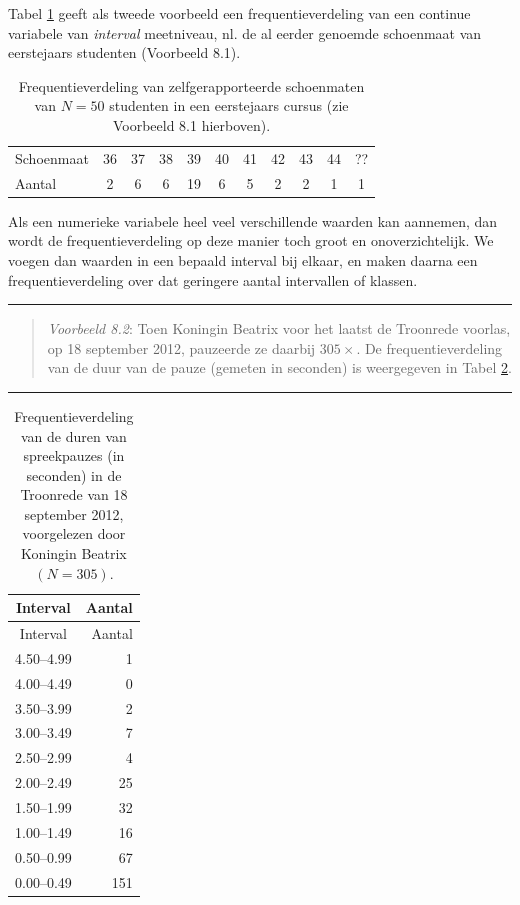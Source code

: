 \documentclass[
]{book}
\begin{document}
Tabel \ref{tab:schoenmaat} geeft als tweede voorbeeld een
frequentieverdeling van een continue variabele van \emph{interval}
meetniveau, nl. de al eerder genoemde schoenmaat van eerstejaars
studenten (Voorbeeld 8.1).

\begin{longtable}[]{@{}lcccccccccc@{}}
\caption{\label{tab:schoenmaat} Frequentieverdeling van zelfgerapporteerde schoenmaten
van \(N=50\) studenten in een eerstejaars cursus (zie
Voorbeeld 8.1 hierboven).}\tabularnewline
\toprule
\endhead
Schoenmaat & 36 & 37 & 38 & 39 & 40 & 41 & 42 & 43 & 44 & ??\tabularnewline
Aantal & 2 & 6 & 6 & 19 & 6 & 5 & 2 & 2 & 1 & 1\tabularnewline
\bottomrule
\end{longtable}

Als een numerieke variabele heel veel verschillende waarden kan
aannemen, dan wordt de frequentieverdeling op deze manier toch groot en
onoverzichtelijk. We voegen dan waarden in een bepaald interval bij
elkaar, en maken daarna een frequentieverdeling over dat geringere
aantal intervallen of klassen.

\begin{center}\rule{0.5\linewidth}{0.5pt}\end{center}

\begin{quote}
\emph{Voorbeeld 8.2}: Toen Koningin Beatrix voor het laatst de Troonrede voorlas,
op 18 september 2012, pauzeerde ze daarbij \(305\times\). De frequentieverdeling
van de duur van de pauze (gemeten in seconden) is weergegeven in
Tabel \ref{tab:troonrede2012pauzes}.
\end{quote}

\begin{center}\rule{0.5\linewidth}{0.5pt}\end{center}

\begin{longtable}[]{@{}cr@{}}
\caption{\label{tab:troonrede2012pauzes} Frequentieverdeling van de duren van spreekpauzes (in seconden) in de Troonrede van 18 september 2012, voorgelezen door Koningin Beatrix \((N=305)\).}\tabularnewline
\toprule
Interval & Aantal\tabularnewline
\midrule
\endfirsthead
\toprule
Interval & Aantal\tabularnewline
\midrule
\endhead
4.50--4.99 & 1\tabularnewline
4.00--4.49 & 0\tabularnewline
3.50--3.99 & 2\tabularnewline
3.00--3.49 & 7\tabularnewline
2.50--2.99 & 4\tabularnewline
2.00--2.49 & 25\tabularnewline
1.50--1.99 & 32\tabularnewline
1.00--1.49 & 16\tabularnewline
0.50--0.99 & 67\tabularnewline
0.00--0.49 & 151\tabularnewline
\bottomrule
\end{longtable}
\end{document}
